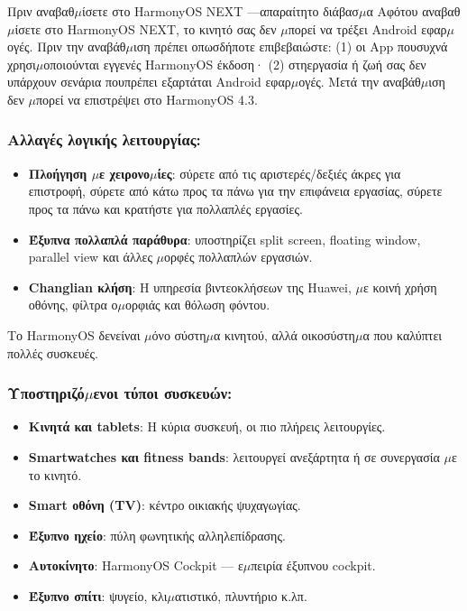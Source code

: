 \begin{tcbwarn}{Πριν αναβαθ$\mu$ίσετε στο HarmonyOS NEXT —απαραίτητο διάβασ$\mu$α}
Αφότου αναβαθ$\mu$ίσετε στο HarmonyOS NEXT, το κινητό σας δεν $\mu$πορεί να τρέξει Android εφαρ$\mu$ογές. Πριν την αναβάθ$\mu$ιση πρέπει οπωσδήποτε επιβεβαιώστε: (1) οι App πουσυχνά χρησι$\mu$οποιούνται εγγενές HarmonyOS έκδοση· (2) στηεργασία ή ζωή σας δεν υπάρχουν σενάρια πουπρέπει εξαρτάται Android εφαρ$\mu$ογές. Μετά την αναβάθ$\mu$ιση δεν $\mu$πορεί να επιστρέψει στο HarmonyOS 4.3.

\end{tcbwarn}

\subsubsection*{Αλλαγές λογικής λειτουργίας:}

\begin{itemize}
  \item \textbf{Πλοήγηση $\mu$ε χειρονο$\mu$ίες}: σύρετε από τις αριστερές/δεξιές άκρες για επιστροφή, σύρετε από κάτω προς τα πάνω για την επιφάνεια εργασίας, σύρετε προς τα πάνω και κρατήστε για πολλαπλές εργασίες.
  \item \textbf{Έξυπνα πολλαπλά παράθυρα}: υποστηρίζει split screen, floating window, parallel view και άλλες $\mu$ορφές πολλαπλών εργασιών.
  \item \textbf{Changlian κλήση}: Η υπηρεσία βιντεοκλήσεων της Huawei, $\mu$ε κοινή χρήση οθόνης, φίλτρα ο$\mu$ορφιάς και θόλωση φόντου.
\end{itemize}


Το HarmonyOS δενείναι $\mu$όνο σύστη$\mu$α κινητού, αλλά οικοσύστη$\mu$α που καλύπτει πολλές συσκευές.

\subsubsection*{Υποστηριζό$\mu$ενοι τύποι συσκευών:}

\begin{itemize}
  \item \textbf{Κινητά και tablets}: Η κύρια συσκευή, οι πιο πλήρεις λειτουργίες.
  \item \textbf{Smartwatches και fitness bands}: λειτουργεί ανεξάρτητα ή σε συνεργασία $\mu$ε το κινητό.
  \item \textbf{Smart οθόνη (TV)}: κέντρο οικιακής ψυχαγωγίας.
  \item \textbf{Έξυπνο ηχείο}: πύλη φωνητικής αλληλεπίδρασης.
  \item \textbf{Αυτοκίνητο}: HarmonyOS Cockpit — ε$\mu$πειρία έξυπνου cockpit.
  \item \textbf{Έξυπνο σπίτι}: ψυγείο, κλι$\mu$ατιστικό, πλυντήριο κ.λπ.
\end{itemize}

